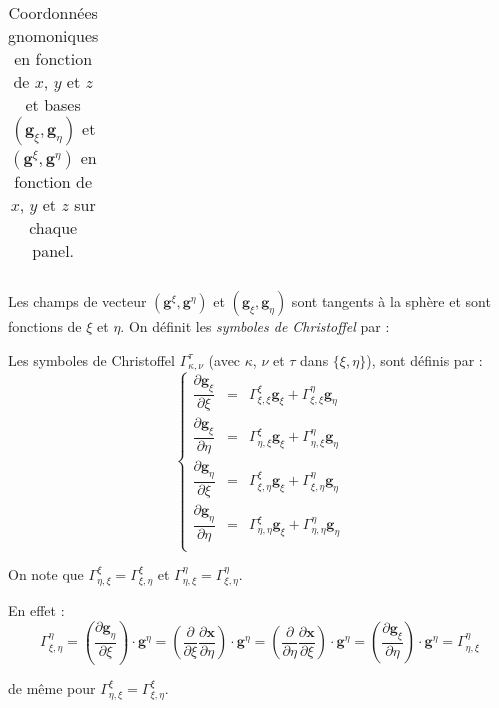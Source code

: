 \begin{table}[htbp]
\begin{center}
\begin{tabular}{|c|c|c|}
\end{tabular}
\end{center}
\caption{Coordonnées gnomoniques en fonction de $x$, $y$ et $z$ et bases $\left( \mathbf{g}_{\xi}, \mathbf{g}_{\eta} \right)$ et $\left( \mathbf{g}^{\xi}, \mathbf{g}^{\eta} \right)$ en fonction de $x$, $y$ et $z$  sur chaque panel.}
\label{tab: base g_xi g_eta}
\end{table}

Les champs de vecteur $( \mathbf{g}^{\xi}, \mathbf{g}^{\eta})$ et $( \mathbf{g}_ {\xi}, \mathbf{g}_{\eta})$ sont tangents à la sphère et sont fonctions de $\xi$ et $\eta$. On définit les \textit{symboles de Christoffel} par :

\begin{definition}
Les symboles de Christoffel $\Gamma_{\kappa,\nu}^{\tau}$ (avec $\kappa$, $\nu$ et $\tau$ dans $\lbrace \xi, \eta \rbrace$), sont définis par :
\begin{equation}
\left\lbrace
\begin{array}{rcl}
\dfrac{\partial \mathbf{g}_{\xi}}{\partial \xi} & = & \Gamma_{\xi,\xi}^{\xi} \mathbf{g}_{\xi} + \Gamma_{\xi,\xi}^{\eta} \mathbf{g}_{\eta}\\

\dfrac{\partial \mathbf{g}_{\xi}}{\partial \eta} & = & \Gamma_{\eta,\xi}^{\xi} \mathbf{g}_{\xi} + \Gamma_{\eta,\xi}^{\eta} \mathbf{g}_{\eta}\\

\dfrac{\partial \mathbf{g}_{\eta}}{\partial \xi} & = & \Gamma_{\xi,\eta}^{\xi} \mathbf{g}_{\xi} + \Gamma_{\xi,\eta}^{\eta} \mathbf{g}_{\eta}\\

\dfrac{\partial \mathbf{g}_{\eta}}{\partial \eta} & = & \Gamma_{\eta,\eta}^{\xi} \mathbf{g}_{\xi} + \Gamma_{\eta,\eta}^{\eta} \mathbf{g}_{\eta}\\
\end{array}
\right.
\end{equation}
\end{definition}

\begin{remarque}
On note que $\Gamma_{\eta,\xi}^{\xi}=\Gamma_{\xi,\eta}^{\xi}$ et $\Gamma_{\eta,\xi}^{\eta}=\Gamma_{\xi,\eta}^{\eta}$.

En effet :
$$\Gamma_{\xi, \eta}^{\eta} = \left( \dfrac{\partial \mathbf{g}_{\eta}}{\partial \xi} \right) \cdot \mathbf{g}^{\eta} = \left( \dfrac{\partial}{\partial \xi} \dfrac{\partial \mathbf{x}}{\partial \eta} \right) \cdot \mathbf{g}^{\eta} = \left( \dfrac{\partial}{\partial \eta} \dfrac{\partial \mathbf{x}}{\partial \xi} \right) \cdot \mathbf{g}^{\eta} = \left( \dfrac{\partial \mathbf{g}_{\xi}}{\partial \eta} \right) \cdot \mathbf{g}^{\eta} = \Gamma_{\eta, \xi}^{\eta}$$

de même pour $\Gamma_{\eta,\xi}^{\xi}=\Gamma_{\xi,\eta}^{\xi}$.
\end{remarque}




